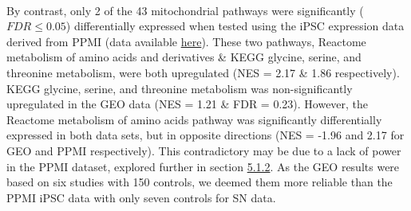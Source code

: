 \documentclass{article}
\begin{document}
\\By contrast, only 2 of the 43 mitochondrial pathways were significantly ($FDR \leq 0.05$) differentially expressed when tested using the iPSC expression data derived from PPMI (data available \href{https://github.com/Thomas-brightwell/PD-MSc-project-code/blob/main/Thesis/Supplementary%20materials/PPMI_gsea_results.csv}{here}). These two pathways, Reactome metabolism of amino acids and derivatives \& KEGG glycine, serine, and threonine metabolism, were both upregulated (NES = 2.17 \& 1.86 respectively). KEGG glycine, serine, and threonine metabolism was non-significantly upregulated in the GEO data (NES = 1.21 \& FDR = 0.23). However, the Reactome metabolism of amino acids pathway was significantly differentially expressed in both data sets, but in opposite directions (NES = -1.96 and 2.17 for GEO and PPMI respectively). This contradictory may be due to a lack of power in the PPMI dataset, explored further in section \hyperref[subsubsec:GEOandPPMI]{5.1.2}. As the GEO results were based on six studies with 150 controls, we deemed them more reliable than the PPMI iPSC data with only seven controls for SN data.
\end{document}
